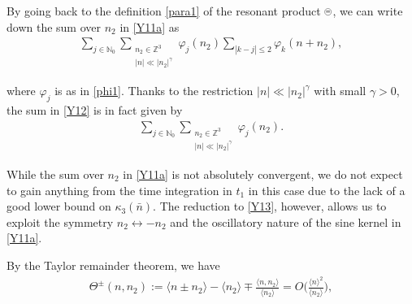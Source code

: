 \documentclass[%
11pt,  reqno]{amsart}
\newcommand{\pe}{\mathbin{\scaleobj{0.7}{\tikz \draw (0,0) node[shape=circle,draw,inner sep=0pt,minimum size=8.5pt] {\scriptsize  $=$};}}}
\newcommand{\1}{\hspace{0.2mm}\text{I}\hspace{0.2mm}}
\newcommand{\noi}{\noindent}
\newcommand{\Z}{\mathbb{Z}}
\newcommand{\kk}{\kappa}
\newcommand{\g}{\gamma}
\newcommand{\jb}[1]
{\langle #1 \rangle}
\newcommand{\N}{\mathbb{N}}
\numberwithin{equation}{section}
\numberwithin{theorem}{section}
\begin{document}
\noi
By going back to the definition \eqref{para1}
of the resonant product $\pe$, 
we can write down the  sum over $n_2$ in \eqref{Y11a} 
as 
\begin{align}
\sum_{j \in \N_0}
\sum_{\substack{n_2 \in \Z^3\\|n| \ll |n_2|^\g}}\varphi_j(n_2)
\sum_{|k - j|\leq 2}\varphi_k(n + n_2), 
\label{Y12}
\end{align}

\noi
where $\varphi_j$ is as in \eqref{phi1}.
Thanks to the restriction $|n| \ll |n_2|^\g$ with small $\g > 0$, 
the sum in \eqref{Y12} is in fact given by 
\begin{align}
\sum_{j \in \N_0}
\sum_{\substack{n_2 \in \Z^3\\|n| \ll |n_2|^\g}}\varphi_j(n_2).
\label{Y13}
\end{align}



\noi
While the sum over $n_2$ in \eqref{Y11a} is not absolutely convergent, 
we do not expect to gain anything from the time integration in $t_1$
in this case
due to the lack of a good lower bound on $\kk_3(\bar n)$.
The reduction to \eqref{Y13}, however, 
allows us to exploit 
the symmetry $n_2 \leftrightarrow -n_2$
and the oscillatory nature of the sine kernel in \eqref{Y11a}.


By the Taylor remainder theorem, we have
\begin{align}
\Theta^\pm(n, n_2)
:=  \jb{n \pm n_2 }- \jb{n_2}
 \mp \frac{\jb{n, n_2}}{\jb{n_2}}
 = O\bigg(\frac{\jb{n}^2}{\jb{n_2}}\bigg), 
\label{Y14}
\end{align}
\end{document}
